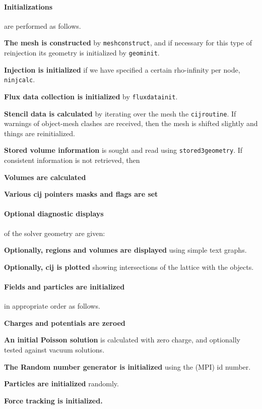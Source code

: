 \documentclass[12pt]{article}
\def\sentence#1{\par\noindent\textbf{#1}}
\begin{document}
\paragraph{Initializations} are performed as follows.
\sentence{The mesh is constructed} by \verb!meshconstruct!, and if
necessary for this type of reinjection its geometry is initialized
by \verb!geominit!.

\sentence{Injection is initialized} if we have specified a certain
rho-infinity per node, \verb!ninjcalc!.

\sentence{Flux data collection is initialized} by \verb!fluxdatainit!.

\sentence{Stencil data is calculated} by iterating over the mesh the
\verb!cijroutine!. If warnings of object-mesh clashes are received,
then the mesh is shifted slightly and things are reinitialized.

\sentence{Stored volume information} is sought and read using
\verb!stored3geometry!. If consistent information is not retrieved, then

\sentence{Volumes are calculated}

\sentence{Various cij pointers masks and flags are set}

\paragraph{Optional diagnostic displays} of the solver geometry are given:

\sentence{Optionally, regions and volumes are displayed} using simple text
graphs. 

\sentence{Optionally, cij is plotted} showing intersections of the
lattice with the objects.

\paragraph{Fields and particles are initialized} in appropriate order
as follows.

\sentence{Charges and potentials are zeroed}

\sentence{An initial Poisson solution} is calculated with zero
charge, and optionally tested against vacuum solutions.

\sentence{The Random number generator is initialized} using the (MPI) id
number. 

\sentence{Particles are initialized} randomly.

\sentence{Force tracking is initialized.}
\end{document}
